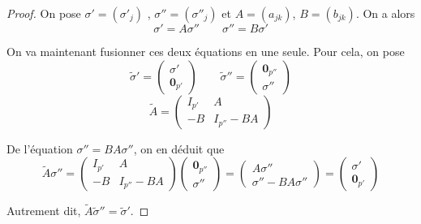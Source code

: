 \documentclass{article}
\theoremstyle{definition}
\theoremstyle{remark}
\begin{document}
\begin{proof}
On pose $\sigma' = (\sigma'_j)$ , $\sigma'' = (\sigma''_j)$ et $A=(a_{jk})$, $B=(b_{jk})$. On a alors
\begin{equation*}
\sigma' = A\sigma'' \qquad
\sigma'' = B\sigma'
\end{equation*}

On va maintenant fusionner ces deux équations en une seule. Pour cela, on pose
\begin{equation*}
\tilde{\sigma}' = \begin{pmatrix}
   \sigma' \\
   \mathbf{0}_{p'}
\end{pmatrix} \qquad
\tilde{\sigma}'' = \begin{pmatrix}
   \mathbf{0}_{p''} \\
   \sigma''
\end{pmatrix}
\end{equation*}
$$ \tilde{A} = \begin{pmatrix}
   I_{p'} & A \\
   -B & I_{p''} - BA 
\end{pmatrix}$$

De l'équation $\sigma'' = BA\sigma''$, on en déduit que
\begin{equation*}
\tilde{A}\sigma'' = \begin{pmatrix}
   I_{p'} & A \\
   -B & I_{p''} - BA 
\end{pmatrix} \begin{pmatrix}
   \mathbf{0}_{p''} \\
   \sigma''
\end{pmatrix} = \begin{pmatrix}
   A\sigma'' \\
   \sigma'' - BA\sigma''
\end{pmatrix} = \begin{pmatrix}
   \sigma' \\
   \mathbf{0}_{p'}
\end{pmatrix}
\end{equation*}

Autrement dit, $\tilde{A}\tilde{\sigma}'' = \tilde{\sigma}'$.


\end{proof}
\end{document}
